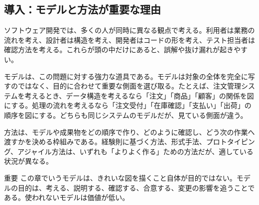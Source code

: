 \subsection*{導入：モデルと方法が重要な理由}
ソフトウェア開発では、多くの人が同時に異なる観点で考える。利用者は業務の流れを考え、設計者は構造を考え、開発者はコードの形を考え、テスト担当者は確認方法を考える。これらが頭の中だけにあると、誤解や抜け漏れが起きやすい。

モデルは、この問題に対する強力な道具である。モデルは対象の全体を完全に写すのではなく、目的に合わせて重要な側面を選び取る。たとえば、注文管理システムを考えるとき、データ構造を考えるなら「注文」「商品」「顧客」の関係を図にする。処理の流れを考えるなら「注文受付」「在庫確認」「支払い」「出荷」の順序を図にする。どちらも同じシステムのモデルだが、見ている側面が違う。

方法は、モデルや成果物をどの順序で作り、どのように確認し、どう次の作業へ渡すかを決める枠組みである。経験則に基づく方法、形式手法、プロトタイピング、アジャイル方法は、いずれも「よりよく作る」ための方法だが、適している状況が異なる。

\begin{pointbox}{重要}
この章でいうモデルは、きれいな図を描くこと自体が目的ではない。モデルの目的は、考える、説明する、確認する、合意する、変更の影響を追うことである。使われないモデルは価値が低い。
\end{pointbox}
